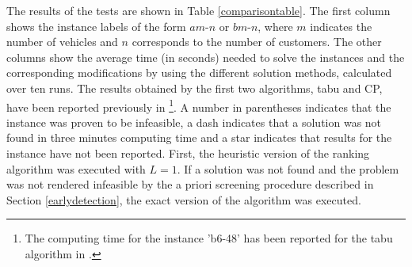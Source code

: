 \documentclass[dissertation,draft*]{aaltoseries}
\begin{document}
The results of the tests are shown in Table \ref{comparisontable}. The first
column shows the instance labels of the form $am$-$n$ or $bm$-$n$, where $m$
indicates the number of vehicles and $n$ corresponds to the number of customers.
The other columns show the average time (in seconds) needed to solve the
instances and the corresponding modifications by using the different solution methods,
calculated over ten runs. 
The results obtained by the first two algorithms, tabu and CP, have been reported
previously in \citep{berbegliathesis,berbegliafeas}\footnote{The computing time for the instance 
'b6-48' has been reported for the tabu algorithm in \citep{ropke2007}.}. 
A number in parentheses indicates that the instance was proven to be infeasible,
a dash indicates that a solution was not found in three minutes computing time and
a star indicates that results for the instance have not been reported. 
First, the heuristic version of the ranking algorithm was executed with $L=1$. If a solution was not found and the problem
was not rendered infeasible by the a priori screening procedure described in
Section \ref{earlydetection}, the exact version of the algorithm was executed.
\end{document}
